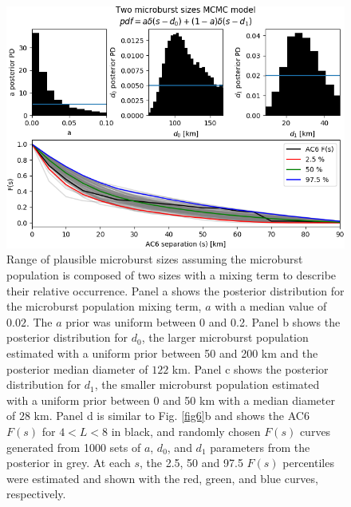 \documentclass[draft]{agujournal2019}
\begin{document}
\begin{figure}
\includegraphics[width=\textwidth]{fig7.png}
\caption{Range of plausible microburst sizes assuming the microburst population is composed of two sizes with a mixing term to describe their relative occurrence. Panel a shows the posterior distribution for the microburst population mixing term, $a$ with a median value of $0.02$. The $a$ prior was uniform between 0 and 0.2. Panel b shows the posterior distribution for $d_0$, the larger microburst population estimated with a uniform prior between 50 and 200 km and the posterior median diameter of $122$ km. Panel c shows the posterior distribution for $d_1$, the smaller microburst population estimated with a uniform prior between 0 and 50 km  with a median diameter of $28$ km. Panel d is similar to Fig. \ref{fig6}b and shows the AC6 $F(s)$ for $4 < L < 8$ in black, and randomly chosen $F(s)$ curves generated from 1000 sets of $a$, $d_0$, and $d_1$ parameters from the posterior in grey. At each $s$, the 2.5, 50 and 97.5 $F(s)$ percentiles were estimated and shown with the red, green, and blue curves, respectively.
} 
\label{fig7}
\end{figure}
\end{document}
